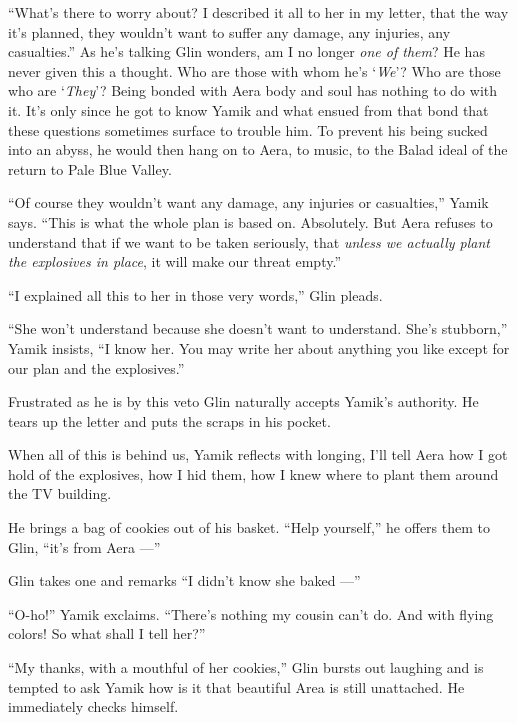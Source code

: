 \documentclass[twoside,11pt,openany]{book}
\begin{document}
``What's there to worry about? I described it all to her in my letter, that the way it's planned,
they   wouldn't want to suffer any damage, any injuries, any casualties.'' As he's talking Glin
wonders, am I no longer \textit{one of them}? He has never given this a
thought. Who are those with whom he's `\textit{We}{}'? Who are those who are `\textit{They}'? Being bonded with Aera
body and soul has nothing to do with it. It's only since he got to know Yamik and what ensued from that
bond that these questions sometimes surface to trouble him. To prevent his being sucked into an abyss, he
would then hang on to Aera, to music, to the Balad ideal of the return to Pale Blue Valley.

``Of course they wouldn't want any damage, any injuries or casualties,'' Yamik says.
``This is what the whole plan is based on. Absolutely. But Aera refuses to understand that if we want to
be taken seriously, that \textit{unless we actually plant the explosives in place}, it
will make our threat empty.''

``I explained all this to her in those very words,'' Glin pleads.

``She won't understand because she doesn't want to understand. She's stubborn,'' Yamik insists, ``I know
her. You may write her about anything you like except for our plan and the explosives.''

Frustrated as he is by this veto Glin naturally accepts Yamik's authority. He tears up the letter and puts the scraps in
his pocket.

When all of this is behind us, Yamik reflects with longing, I'll tell Aera how I got hold of the explosives, how I hid
them, how I knew where to plant them around the TV building.

He brings a bag of cookies out of his basket. ``Help yourself,'' he offers them to Glin,
``it's from Aera ---''

Glin takes one and remarks ``I didn't know she baked ---''

``O-ho!'' Yamik exclaims. ``There's nothing my cousin can't do. And with flying
colors! So what shall I tell her?''

``My thanks, with a mouthful of her cookies,'' Glin bursts out
laughing and is tempted to ask
Yamik how is it that beautiful Area is still unattached. He immediately checks himself.



\chapter{}
\end{document}
